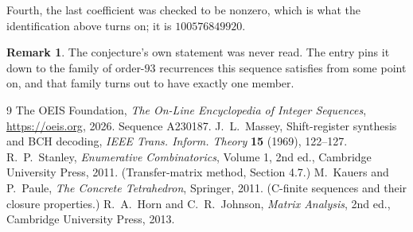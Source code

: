 \documentclass[11pt,a4paper]{article}
\theoremstyle{plain}
\theoremstyle{definition}
\newtheorem{remark}[theorem]{Remark}
\begin{document}
Fourth, the last coefficient was checked to be nonzero, which is what the identification above
turns on; it is $100576849920$.

\begin{remark}
The conjecture's own statement was never read. The entry pins it down to the family of
order-$93$ recurrences this sequence satisfies from some point on, and that family turns
out to have exactly one member.
\end{remark}

\begin{thebibliography}{9}
 The OEIS Foundation, \emph{The On-Line Encyclopedia of Integer
Sequences}, \url{https://oeis.org}, 2026. Sequence A230187.
 J.~L.~Massey, Shift-register synthesis and BCH decoding, \emph{IEEE
Trans. Inform. Theory} \textbf{15} (1969), 122--127.
 R.~P.~Stanley, \emph{Enumerative Combinatorics}, Volume 1, 2nd ed.,
Cambridge University Press, 2011. (Transfer-matrix method, Section 4.7.)
 M.~Kauers and P.~Paule, \emph{The Concrete Tetrahedron}, Springer, 2011.
(C-finite sequences and their closure properties.)
 R.~A.~Horn and C.~R.~Johnson, \emph{Matrix Analysis}, 2nd ed., Cambridge
University Press, 2013.
\end{thebibliography}
\end{document}
